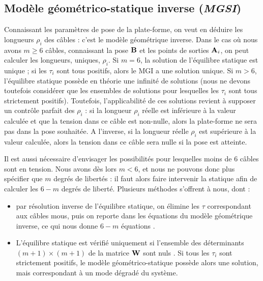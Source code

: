 \subsection{Modèle géométrico-statique inverse ({\it MGSI})} 
\label{chap0-2-3}

Connaissant les paramètres de pose de la plate-forme, on veut en déduire les 
longueurs $\rho_i$ des câbles : c'est le modèle géométrique inverse. 
Dans le cas où nous avons $m \geq 6$ câbles, connaissant la pose ${\bf B}$ et 
les points de sorties ${\bf A}_i$, on peut calculer les longueurs, uniques, 
$\rho_i$. Si $m = 6$, la solution de l'équilibre statique est unique ; si les 
$\tau_i$ sont tous positifs, alors le MGI a une solution unique. 
Si $m > 6$, l'\'equilibre statique possède en théorie une infinité de solutions 
(nous ne devons toutefois consid\'erer que les ensembles de solutions pour 
lesquelles les $\tau_i$ sont tous strictement positifs). Toutefois, 
l'applicabilit\'e de ces solutions revient \`a supposer un contr\^ole parfait 
des $\rho_i$ : si la longueur $\rho_i$ r\'eelle est inf\'erieure \`a la valeur 
calcul\'ee et que la tension dans ce c\^able est non-nulle, alors la 
plate-forme ne sera pas dans la pose souhait\'ee. A l'inverse, si la 
longueur r\'eelle $\rho_i$ est sup\'erieure \`a la valeur calcul\'ee, alors la 
tension dans ce c\^able sera nulle si la pose est atteinte.

Il est aussi n\'ecessaire d'envisager les possibilit\'es pour lesquelles moins 
de $6$ c\^ables sont en tension. Nous avons d\`es lors $m < 6$, et nous ne 
pouvons donc plus sp\'ecifier que $m$ degr\'es de libert\'es : il faut alors 
faire intervenir la statique afin de calculer les $6-m$ degr\'es de libert\'e. 
Plusieurs m\'ethodes s'offrent \`a nous, dont :
\begin{itemize}
 \item par r\'esolution inverse de l'\'equilibre statique, on \'elimine les 
$\tau$ correspondant aux c\^ables mous, puis on reporte dans les \'equations du 
mod\`ele g\'eom\'etrique inverse, ce qui nous donne $6-m$ \'equations 
\cite{2010:Carricato.Merlet}.
\item L'équilibre statique est vérifié uniquement si l'ensemble des déterminants 
$(m+1) \times (m+1)$ de la matrice ${\bf W}$ sont nuls 
\cite{carricato_merlet2013}. Si tous les $\tau_i$ sont strictement positifs, le 
modèle géométrico-statique possède alors une solution, mais correspondant à un 
mode dégradé du système.
\end{itemize}


